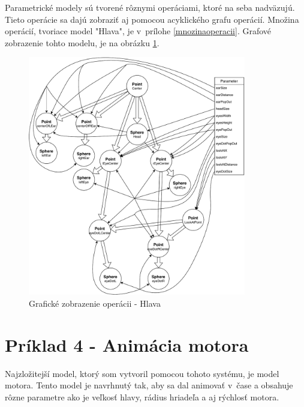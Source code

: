 Parametrické modely sú tvorené rôznymi operáciami, ktoré na seba nadväzujú. Tieto operácie sa dajú zobraziť aj pomocou acyklického grafu operácií. Množina operácií, tvoriace model "Hlava", je v~prílohe \ref{mnozinaoperacii}. Grafové zobrazenie tohto modelu, je na obrázku \ref{fig:headGraph}.
\begin{figure}[H]
	\centering
	\includegraphics[width=0.85\textwidth]{obrazky-figures/Diagram/DP Navrh operacii-Head - Graf.pdf}
	\caption{Grafické zobrazenie operácii - Hlava}
	\label{fig:headGraph}
\end{figure}

\section*{Príklad 4 - Animácia motora}
Najzložitejší model, ktorý som vytvoril pomocou tohoto systému, je model motora. Tento model je navrhnutý tak, aby sa dal animovať v~čase a obsahuje rôzne parametre ako je veľkosť hlavy, rádius hriadeľa a aj rýchlosť motora.

